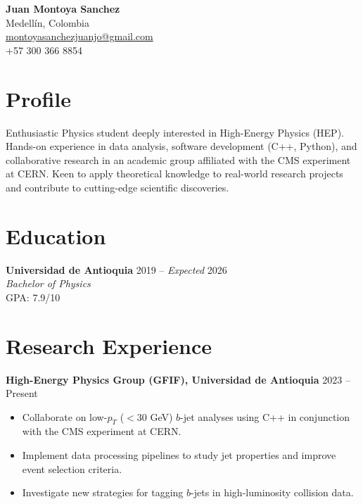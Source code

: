 \documentclass[a4paper,11pt]{article}
\begin{document}
\begin{center}
    {\LARGE \textbf{Juan Montoya Sanchez}} \\
    \vspace{1mm}
    Medellín, Colombia \\
    \href{mailto:montoyasanchezjuanjo@gmail.com}{montoyasanchezjuanjo@gmail.com} \\
    +57 300 366 8854
\end{center}

\section*{Profile}
Enthusiastic Physics student deeply interested in High-Energy Physics (HEP). 
Hands-on experience in data analysis, software development (C++, Python), 
and collaborative research in an academic group affiliated with the CMS experiment at CERN. 
Keen to apply theoretical knowledge to real-world research projects 
and contribute to cutting-edge scientific discoveries.

\section*{Education}
\textbf{Universidad de Antioquia} \hfill 2019 -- \textit{Expected} 2026 \\
\textit{Bachelor of Physics} \\
GPA: 7.9/10

\section*{Research Experience}
\textbf{High-Energy Physics Group (GFIF), Universidad de Antioquia} \hfill 2023 -- Present 
\begin{itemize}
    \item Collaborate on low-$p_T$ ($<30$ GeV) $b$-jet analyses using C++ in conjunction with the CMS experiment at CERN.
    \item Implement data processing pipelines to study jet properties and improve event selection criteria.
    \item Investigate new strategies for tagging $b$-jets in high-luminosity collision data.
\end{itemize}
\end{document}

